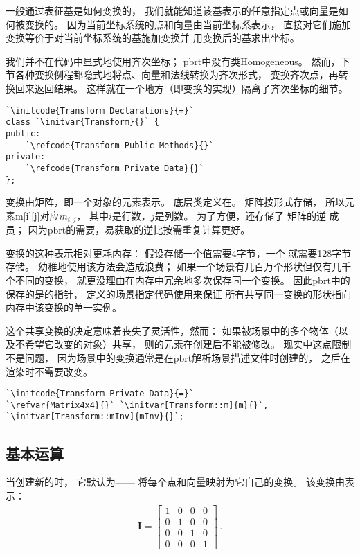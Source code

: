 一般通过表征基是如何变换的，
我们就能知道该基表示的任意指定点或向量是如何被变换的。
因为当前坐标系统的点和向量由当前坐标系表示，
直接对它们施加变换等价于对当前坐标系统的基施加变换并
用变换后的基求出坐标。

我们并不在代码中显式地使用齐次坐标；
pbrt中没有类{\ttfamily Homogeneous}。
然而，下节各种变换例程都隐式地将点、向量和法线转换为齐次形式，
变换齐次点，再转换回来返回结果。
这样就在一个地方（即变换的实现）隔离了齐次坐标的细节。
\begin{lstlisting}
`\initcode{Transform Declarations}{=}`
class `\initvar{Transform}{}` {
public:
    `\refcode{Transform Public Methods}{}`
private:
    `\refcode{Transform Private Data}{}`
};
\end{lstlisting}

变换由矩阵，即一个对象的元素表示。
底层类定义在。
矩阵按形式存储，
所以元素{\ttfamily m[i][j]}对应$m_{i,j}$，
其中$i$是行数，$j$是列数。
为了方便，还存储了
矩阵的逆
成员；
因为pbrt的需要，易获取的逆比按需重复计算更好。

变换的这种表示相对更耗内存：
假设存储一个值需要4字节，一个
就需要128字节存储。
幼稚地使用该方法会造成浪费；
如果一个场景有几百万个形状但仅有几千个不同的变换，
就更没理由在内存中冗余地多次保存同一个变换。
因此pbrt中的保存的是的指针，
定义的场景指定代码使用来保证
所有共享同一变换的形状指向内存中该变换的单一实例。

这个共享变换的决定意味着丧失了灵活性，然而：
如果被场景中的多个物体（以及不希望它改变的对象）共享，
则的元素在创建后不能被修改。
现实中这点限制不是问题，
因为场景中的变换通常是在pbrt解析场景描述文件时创建的，
之后在渲染时不需要改变。
\begin{lstlisting}
`\initcode{Transform Private Data}{=}`
`\refvar{Matrix4x4}{}` `\initvar[Transform::m]{m}{}`, `\initvar[Transform::mInv]{mInv}{}`;
\end{lstlisting}

\subsection{基本运算}\label{sub:基本运算}
当创建新的时，
它默认为——
将每个点和向量映射为它自己的变换。
该变换由表示：
\begin{align*}
    \bm I=\left[
        \begin{array}{cccc}
            1 & 0 & 0 & 0 \\
            0 & 1 & 0 & 0 \\
            0 & 0 & 1 & 0 \\
            0 & 0 & 0 & 1
        \end{array}
        \right]\, .
\end{align*}

